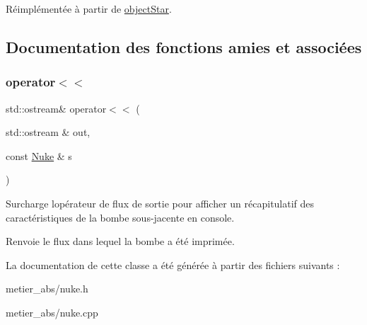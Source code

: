 Réimplémentée à partir de \mbox{\hyperlink{classobject_star_a5155713af07f8397057706a1eeb843ed}{object\+Star}}.



\subsection{Documentation des fonctions amies et associées}
\mbox{\label{class_nuke_a9de8a2a72db7974fd22deac7ea5728a4}} 
\subsubsection{\texorpdfstring{operator$<$$<$}{operator<<}}
{\footnotesize\ttfamily std\+::ostream\& operator$<$$<$ (\begin{DoxyParamCaption}\item[{std\+::ostream \&}]{out,  }\item[{const \mbox{\hyperlink{class_nuke}{Nuke}} \&}]{s }\end{DoxyParamCaption})\hspace{0.3cm}{\ttfamily [friend]}}

Surcharge l\textquotesingle{}opérateur de flux de sortie pour afficher un récapitulatif des caractéristiques de la bombe sous-\/jacente en console. \begin{DoxyReturn}{Renvoie}
le flux dans lequel la bombe a été imprimée. 
\end{DoxyReturn}


La documentation de cette classe a été générée à partir des fichiers suivants \+:\begin{DoxyCompactItemize}
\item 
metier\+\_\+abs/nuke.\+h\item 
metier\+\_\+abs/nuke.\+cpp\end{DoxyCompactItemize}
